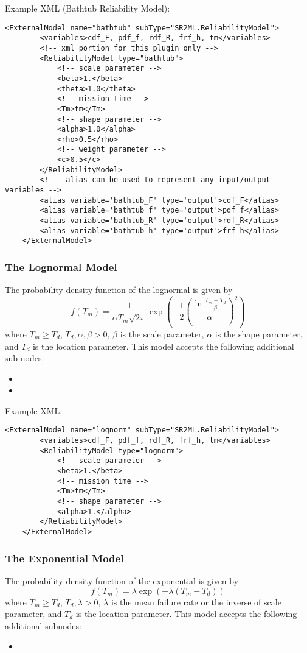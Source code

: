 Example XML (Bathtub Reliability Model):
\begin{lstlisting}[style=XML]
	<ExternalModel name="bathtub" subType="SR2ML.ReliabilityModel">
		<variables>cdf_F, pdf_f, rdf_R, frf_h, tm</variables>
		<!-- xml portion for this plugin only -->
		<ReliabilityModel type="bathtub">
			<!-- scale parameter -->
			<beta>1.</beta>
			<theta>1.0</theta>
			<!-- mission time -->
			<Tm>tm</Tm>
			<!-- shape parameter -->
			<alpha>1.0</alpha>
			<rho>0.5</rho>
			<!-- weight parameter -->
			<c>0.5</c>
		</ReliabilityModel>
		<!--  alias can be used to represent any input/output variables -->
		<alias variable='bathtub_F' type='output'>cdf_F</alias>
		<alias variable='bathtub_f' type='output'>pdf_f</alias>
		<alias variable='bathtub_R' type='output'>rdf_R</alias>
		<alias variable='bathtub_h' type='output'>frf_h</alias>
	</ExternalModel>
\end{lstlisting}

\subsubsection{The Lognormal Model}
The probability density function of the lognormal is given by
\begin{equation}
	f(T_m) = \frac{1}{\alpha T_m\sqrt{2\pi}}\exp\left(-\frac{1}{2}\left(\frac{\ln{\frac{T_m-T_d}{\beta}}}{\alpha}\right)^2\right)
\end{equation}
where $T_m\geq T_d$, $T_d, \alpha, \beta >0$, $\beta$ is the scale parameter, $\alpha$ is the shape
parameter, and $T_d$ is the location parameter.
This model accepts the following additional sub-nodes:
\begin{itemize}
	\item {}
	\item {}
\end{itemize}

Example XML:
\begin{lstlisting}[style=XML]
	<ExternalModel name="lognorm" subType="SR2ML.ReliabilityModel">
		<variables>cdf_F, pdf_f, rdf_R, frf_h, tm</variables>
		<ReliabilityModel type="lognorm">
			<!-- scale parameter -->
			<beta>1.</beta>
			<!-- mission time -->
			<Tm>tm</Tm>
			<!-- shape parameter -->
			<alpha>1.</alpha>
		</ReliabilityModel>
	</ExternalModel>
\end{lstlisting}

\subsubsection{The Exponential Model}
The probability density function of the exponential is given by
\begin{equation}
	f(T_m) = \lambda\exp\left(-\lambda\left(T_m-T_d\right)\right)
\end{equation}
where $T_m\geq T_d$, $T_d, \lambda >0$, $\lambda$ is the mean failure rate or the inverse of scale parameter,
and $T_d$ is the location parameter.
This model accepts the following additional subnodes:
\begin{itemize}
	\item {}
\end{itemize}

